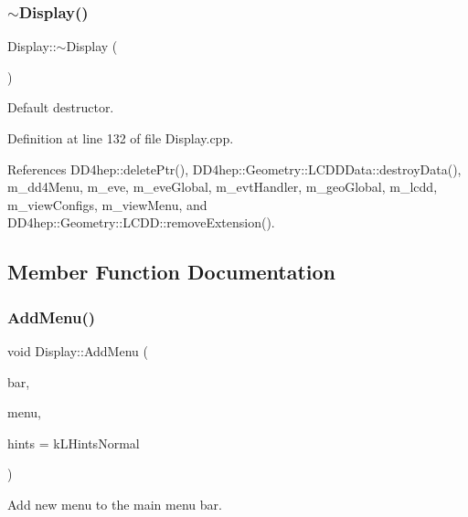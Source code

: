 \subsubsection{\texorpdfstring{$\sim$\+Display()}{~Display()}}
{\footnotesize\ttfamily Display\+::$\sim$\+Display (\begin{DoxyParamCaption}{ }\end{DoxyParamCaption})\hspace{0.3cm}{\ttfamily [virtual]}}



Default destructor. 



Definition at line 132 of file Display.\+cpp.



References D\+D4hep\+::delete\+Ptr(), D\+D4hep\+::\+Geometry\+::\+L\+C\+D\+D\+Data\+::destroy\+Data(), m\+\_\+dd4\+Menu, m\+\_\+eve, m\+\_\+eve\+Global, m\+\_\+evt\+Handler, m\+\_\+geo\+Global, m\+\_\+lcdd, m\+\_\+view\+Configs, m\+\_\+view\+Menu, and D\+D4hep\+::\+Geometry\+::\+L\+C\+D\+D\+::remove\+Extension().



\subsection{Member Function Documentation}
\hypertarget{class_d_d4hep_1_1_display_ac2ef8ca2957cd39ad268c7536edb6757}{}\label{class_d_d4hep_1_1_display_ac2ef8ca2957cd39ad268c7536edb6757} 
\subsubsection{\texorpdfstring{Add\+Menu()}{AddMenu()}}
{\footnotesize\ttfamily void Display\+::\+Add\+Menu (\begin{DoxyParamCaption}\item[{T\+G\+Menu\+Bar $\ast$}]{bar,  }\item[{\hyperlink{class_d_d4hep_1_1_popup_menu}{Popup\+Menu} $\ast$}]{menu,  }\item[{int}]{hints = {\ttfamily kLHintsNormal} }\end{DoxyParamCaption})\hspace{0.3cm}{\ttfamily [virtual]}}



Add new menu to the main menu bar. 



